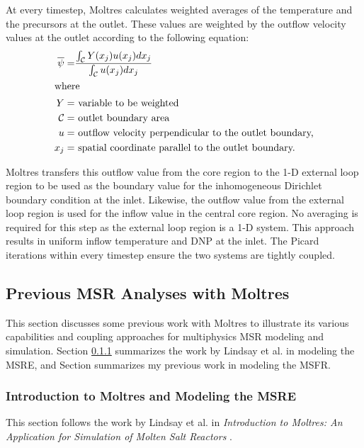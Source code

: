 At every timestep, Moltres calculates weighted averages of the
temperature and the precursors at the outlet. These values are weighted by the
outflow velocity values at the outlet according to the following equation:
%
\begin{align}
    \overline{\psi} =& \frac{\int_\mathcal{C} Y(x_j) u(x_j) dx_j}{
    \int_\mathcal{C} u(x_j) dx_j} \\
    \shortintertext{where}
    Y =& \text{ variable to be weighted} \nonumber \\
    \mathcal{C} =& \text{ outlet boundary area} \nonumber \\
    u =& \text{ outflow velocity perpendicular to the outlet boundary,} \nonumber \\
    x_j =& \text{ spatial coordinate parallel to the outlet boundary.}
    \nonumber
\end{align}

Moltres transfers this outflow value from the core region to the 1-D
external loop region to be used as the boundary value for the inhomogeneous
Dirichlet boundary
condition at the inlet. Likewise, the outflow value from the external
loop region is used for the inflow value in the central core region. No
averaging is required for this step as the external loop region is a 1-D system.
This approach results in uniform inflow temperature and \gls{DNP} at the
inlet. The Picard iterations within every timestep ensure the two systems
are tightly coupled.

\subsection{Previous \gls{MSR} Analyses with Moltres} \label{sec:moltres-previous}

This section discusses some previous work with Moltres to illustrate its
various capabilities and coupling approaches for multiphysics \gls{MSR}
modeling and simulation. Section \ref{sec:msre} summarizes the work by Lindsay et
al. \cite{lindsay_introduction_2018} in modeling the \gls{MSRE}, and Section
\cite{park_advancement_2020} summarizes my previous work in modeling the
\gls{MSFR}.

\subsubsection{Introduction to Moltres and Modeling the MSRE} \label{sec:msre}

This section follows the work by Lindsay et al. in \textit{Introduction to Moltres:
An Application for Simulation of Molten Salt Reactors}
\cite{lindsay_introduction_2018}.

